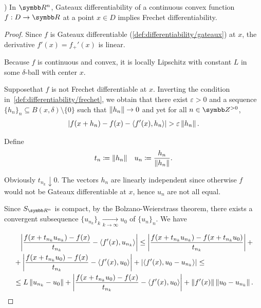 \begin{theorem}\label{thm:rn_continuous_convex_gateaux_implies_frechet}\cite[exercise 1.15(a]{Phelps1993})
  In \( \BB{R}^n \), Gateaux differentiability of a continuous convex function \( f: D \to \BB{R} \) at a point \( x \in D \) implies Frechet differentiability.
\end{theorem}
\begin{proof}
  Since \( f \) is Gateaux differentiable (\cref{def:differentiability/gateaux}) at \( x \), the derivative \( f'(x) = f_+'(x) \) is linear.

  Because \( f \) is continuous and convex, it is locally Lipschitz with constant \( L \) in some \( \delta \)-ball with center \( x \).

  Suppose\LEM that \( f \) is not Frechet differentiable at \( x \). Inverting the condition in~\cref{def:differentiability/frechet}, we obtain that there exist \( \varepsilon > 0 \) and a sequence \( \{ h_n \}_n \subseteq B(x, \delta) \setminus \{ 0 \} \) such that \( \left\Vert h_n \right\Vert \to 0 \) and yet for all \( n \in \BB{Z}^{>0} \),
  \begin{align}\label{thm:rn_continuous_convex_gateaux_implies_frechet/frechet_assumption}
    \left\vert f(x + h_n) - f(x) - \left\langle f'(x), h_n \right\rangle \right\vert > \varepsilon \left\Vert h_n \right\Vert.
  \end{align}

  Define
  \begin{align*}
    t_n \coloneqq \left\Vert h_n \right\Vert
    &&
    u_n \coloneqq \frac{h_n} {\left\Vert h_n \right\Vert}.
  \end{align*}

  Obviously \( t_{n_k} \downarrow 0 \). The vectors \( h_n \) are linearly independent since otherwise \( f \) would not be Gateaux differentiable at \( x \), hence \( u_n \) are not all equal.

  Since \( S_{\BB{R}^n} \) is compact\USC, by the Bolzano-Weierstrass theorem, there exists a convergent subsequence \( \{ u_{n_k} \}_k \underset {k \to \infty} \to u_0 \) of \( \{ u_n \}_n \). We have

  \begin{align}\label{thm:rn_continuous_convex_gateaux_implies_frechet/frechet_estimate}
    &\phantom= \Abs{\frac {f(x + t_{n_k} u_{n_k}) - f(x)} {t_{n_k}} - \Prod{f'(x)} {u_{n_k}}}
    \leq \nonumber
    \Abs{\frac {f(x + t_{n_k} u_{n_k}) - f(x + t_{n_k} u_0)} {t_{n_k}}} + \\ &+ \Abs{\frac {f(x + t_{n_k} u_0) - f(x)} {t_{n_k}} - \Prod{f'(x)} {u_0}} + \Abs{\Prod{f'(x)} {u_0 - u_{n_k}}}
    \leq \nonumber \\ &\leq
    L \Norm{u_{n_k} - u_0} + \Abs{\frac {f(x + t_{n_k} u_0) - f(x)} {t_{n_k}} - \Prod{f'(x)} {u_0}} + \Norm{f'(x)} \Norm{u_0 - u_{n_k}}.
  \end{align}


\end{proof}
